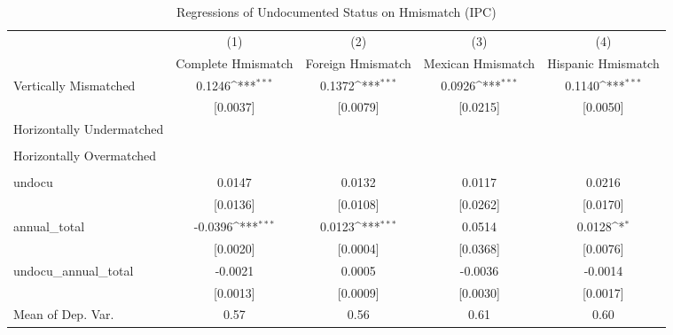 \begin{table}[htbp]\centering
\def\sym#1{\ifmmode^{#1}\else\(^{#1}\)\fi}
\caption{Regressions of Undocumented Status on Hmismatch (IPC)}
\begin{tabular}{l*{4}{c}}
\toprule
                    &\multicolumn{1}{c}{(1)}         &\multicolumn{1}{c}{(2)}         &\multicolumn{1}{c}{(3)}         &\multicolumn{1}{c}{(4)}         \\
                    &Complete Hmismatch         &Foreign Hmismatch         &Mexican Hmismatch         &Hispanic Hmismatch         \\
\midrule
Vertically Mismatched&      0.1246\sym{***}&      0.1372\sym{***}&      0.0926\sym{***}&      0.1140\sym{***}\\
                    &    [0.0037]         &    [0.0079]         &    [0.0215]         &    [0.0050]         \\
\addlinespace
Horizontally Undermatched&                     &                     &                     &                     \\
                    &                     &                     &                     &                     \\
\addlinespace
Horizontally Overmatched&                     &                     &                     &                     \\
                    &                     &                     &                     &                     \\
\addlinespace
undocu              &      0.0147         &      0.0132         &      0.0117         &      0.0216         \\
                    &    [0.0136]         &    [0.0108]         &    [0.0262]         &    [0.0170]         \\
\addlinespace
annual\_total        &     -0.0396\sym{***}&      0.0123\sym{***}&      0.0514         &      0.0128\sym{*}  \\
                    &    [0.0020]         &    [0.0004]         &    [0.0368]         &    [0.0076]         \\
\addlinespace
undocu\_annual\_total &     -0.0021         &      0.0005         &     -0.0036         &     -0.0014         \\
                    &    [0.0013]         &    [0.0009]         &    [0.0030]         &    [0.0017]         \\
\midrule
Mean of Dep. Var.   &        0.57         &        0.56         &        0.61         &        0.60         \\

\end{tabular}
\end{table}
